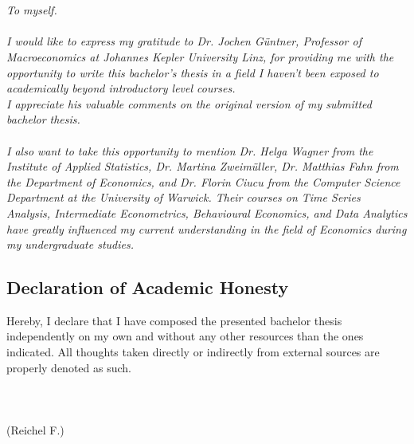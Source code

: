 

{%
	\chapter*{}

\textit{
To myself.\\ \\
I would like to express my gratitude to Dr. Jochen Güntner, Professor of Macroeconomics at Johannes Kepler University Linz, for providing me with the opportunity to write this bachelor's thesis in a field I haven't been exposed to academically beyond introductory level courses. \\
I appreciate his valuable comments on the original version of my submitted bachelor thesis.\\ \\
I also want to take this opportunity to mention Dr. Helga Wagner from the Institute of Applied Statistics, Dr. Martina Zweimüller, Dr. Matthias Fahn from the Department of Economics, and Dr. Florin Ciucu from the Computer Science Department at the University of Warwick. Their courses on Time Series Analysis, Intermediate Econometrics, Behavioural Economics, and Data Analytics have greatly influenced my current understanding in the field of Economics during my undergraduate studies.
}

\newpage

\section*{Declaration of Academic Honesty}


Hereby, I declare that I have composed the presented bachelor thesis independently on my own
and without any other resources than the ones indicated. All thoughts taken directly or
indirectly from external sources are properly denoted as such.\\
\\ \\ \\
(Reichel F.)



}
